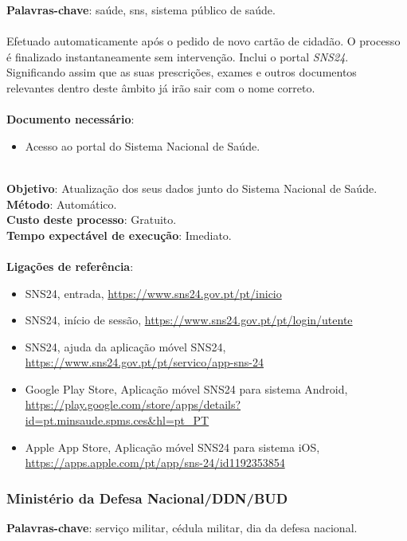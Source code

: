 \textbf{Palavras-chave}: saúde, sns, sistema público de saúde. \\
\\
Efetuado automaticamente após o pedido de novo cartão de cidadão. O
processo é finalizado instantaneamente sem intervenção. Inclui o portal
\emph{SNS24}. Significando assim que as suas prescrições, exames e
outros documentos relevantes dentro deste âmbito já irão sair com o nome
correto.\\
\\
\textbf{Documento necessário}:
\begin{itemize}
	\item Acesso ao portal do Sistema Nacional de Saúde.
\end{itemize}
\leavevmode\\
\textbf{Objetivo}: Atualização dos seus dados junto do Sistema Nacional de Saúde. \\
\textbf{Método}: Automático. \\
\textbf{Custo deste processo}: Gratuito. \\
\textbf{Tempo expectável de execução}: Imediato. \\
\\
\textbf{Ligações de referência}:
\begin{itemize}
	\item SNS24, entrada, \url{https://www.sns24.gov.pt/pt/inicio}
	\item SNS24, início de sessão, \url{https://www.sns24.gov.pt/pt/login/utente}
	\item SNS24, ajuda da aplicação móvel SNS24, \url{https://www.sns24.gov.pt/pt/servico/app-sns-24}
	\item Google Play Store, Aplicação móvel SNS24 para sistema Android, \url{https://play.google.com/store/apps/details?id=pt.minsaude.spms.ces\&hl=pt\_PT}
	\item Apple App Store, Aplicação móvel SNS24 para sistema iOS, \url{https://apps.apple.com/pt/app/sns-24/id1192353854}
\end{itemize}

\newpage

\subsubsection{Ministério da Defesa	Nacional/DDN/BUD}

\textbf{Palavras-chave}: serviço militar, cédula militar, dia da defesa nacional.

